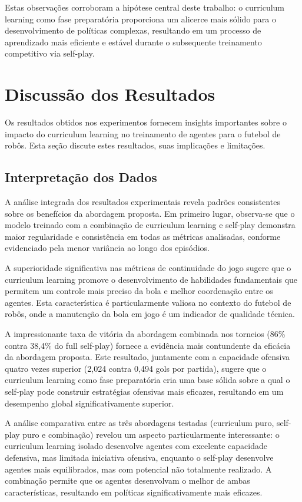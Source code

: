 Estas observações corroboram a hipótese central deste trabalho: o curriculum learning como fase preparatória proporciona um alicerce mais sólido para o desenvolvimento de políticas complexas, resultando em um processo de aprendizado mais eficiente e estável durante o subsequente treinamento competitivo via self-play.


\section{Discussão dos Resultados}
\label{sec:discussao_resultados}

Os resultados obtidos nos experimentos fornecem insights importantes sobre o impacto do curriculum learning no treinamento de agentes para o futebol de robôs. Esta seção discute estes resultados, suas implicações e limitações.

\subsection{Interpretação dos Dados}

A análise integrada dos resultados experimentais revela padrões consistentes sobre os benefícios da abordagem proposta. Em primeiro lugar, observa-se que o modelo treinado com a combinação de curriculum learning e self-play demonstra maior regularidade e consistência em todas as métricas analisadas, conforme evidenciado pela menor variância ao longo dos episódios.

A superioridade significativa nas métricas de continuidade do jogo sugere que o curriculum learning promove o desenvolvimento de habilidades fundamentais que permitem um controle mais preciso da bola e melhor coordenação entre os agentes. Esta característica é particularmente valiosa no contexto do futebol de robôs, onde a manutenção da bola em jogo é um indicador de qualidade técnica.

A impressionante taxa de vitória da abordagem combinada nos torneios (86\% contra 38,4\% do full self-play) fornece a evidência mais contundente da eficácia da abordagem proposta. Este resultado, juntamente com a capacidade ofensiva quatro vezes superior (2,024 contra 0,494 gols por partida), sugere que o curriculum learning como fase preparatória cria uma base sólida sobre a qual o self-play pode construir estratégias ofensivas mais eficazes, resultando em um desempenho global significativamente superior.

A análise comparativa entre as três abordagens testadas (curriculum puro, self-play puro e combinação) revelou um aspecto particularmente interessante: o curriculum learning isolado desenvolve agentes com excelente capacidade defensiva, mas limitada iniciativa ofensiva, enquanto o self-play desenvolve agentes mais equilibrados, mas com potencial não totalmente realizado. A combinação permite que os agentes desenvolvam o melhor de ambas características, resultando em políticas significativamente mais eficazes.

